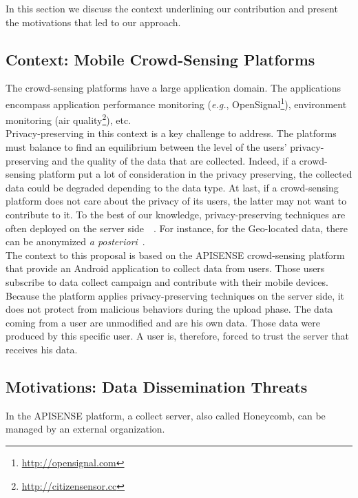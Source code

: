 

In this section we discuss the context underlining our contribution and present the motivations that led to our approach.

\subsection{Context: Mobile Crowd-Sensing Platforms}

The crowd-sensing platforms have a large application domain.
The applications encompass application performance monitoring (\emph{e.g.}, OpenSignal\footnote{\url{http://opensignal.com}}), environment monitoring (air quality\footnote{\url{http://citizensensor.cc}}), etc.
\\

Privacy-preserving in this context is a key challenge to address.
The platforms must balance to find an equilibrium between the level of the users' privacy-preserving and the quality of the data that are collected.
Indeed, if a crowd-sensing platform put a lot of consideration in the privacy preserving, the collected data could be degraded depending to the data type.
At last, if a crowd-sensing platform does not care about the privacy of its users, the latter may not want to contribute to it.
To the best of our knowledge, privacy-preserving techniques are often deployed on the server side~\cite{DBLP:conf/mobisys/CorneliusKKPST08}~\cite{DBLP:conf/dais/HadererRS13}.
For instance, for the Geo-located data, there can be anonymized \emph{a posteriori}~\cite{DBLP:conf/icdcs/PrimaultMB15}.
\\

The context to this proposal is based on the APISENSE crowd-sensing platform that provide an Android application to collect data from users.
Those users subscribe to data collect campaign and contribute with their mobile devices.
Because the platform applies privacy-preserving techniques on the server side, it does not protect from malicious behaviors during the upload phase.
The data coming from a user are unmodified and are his own data.
Those data were produced by this specific user.
A user is, therefore, forced to trust the server that receives his data.

\subsection{Motivations: Data Dissemination Threats}

In the APISENSE platform, a collect server, also called Honeycomb, can be managed by an external organization.
\\

